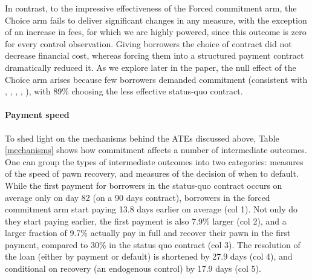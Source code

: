 \documentclass[12pt, a4paper]{article}
\begin{document}
In contrast, to the impressive effectiveness of the Forced commitment arm, the Choice arm fails to deliver significant changes in any measure, with the exception of an increase in fees, for which we are highly powered, since this outcome is zero for every control observation. Giving borrowers the choice of contract did not decrease financial cost, whereas forcing them into a structured payment contract dramatically reduced it. As we explore later in the paper, the null effect of the Choice arm arises because few borrowers demanded commitment (consistent with \cite{Ashraf}, \cite{Gine}, \cite{Ted}, \cite{Royer}, \cite{Sprenger}), with 89\% choosing the less effective status-quo contract.

\paragraph*{Payment speed} To shed light on the mechanisms behind the ATEs discussed above, Table \ref{mechanisms} shows how commitment affects a number of intermediate outcomes. One can group the types of intermediate outcomes into two categories: measures of the speed of pawn recovery, and measures of the decision of when to default. While the first payment for borrowers in the status-quo contract occurs on average only on day 82 (on a 90 days contract), borrowers in the forced commitment arm start paying 13.8 days earlier on average (col 1). Not only do they start paying earlier, the first payment is also 7.9\% larger (col 2), and a larger fraction of 9.7\% actually pay in full and recover their pawn in the first payment, compared to 30\% in the status quo contract (col 3). The resolution of the loan (either by payment or default) is shortened by 27.9 days (col 4), and conditional on recovery (an endogenous control) by 17.9 days (col 5).
\end{document}
